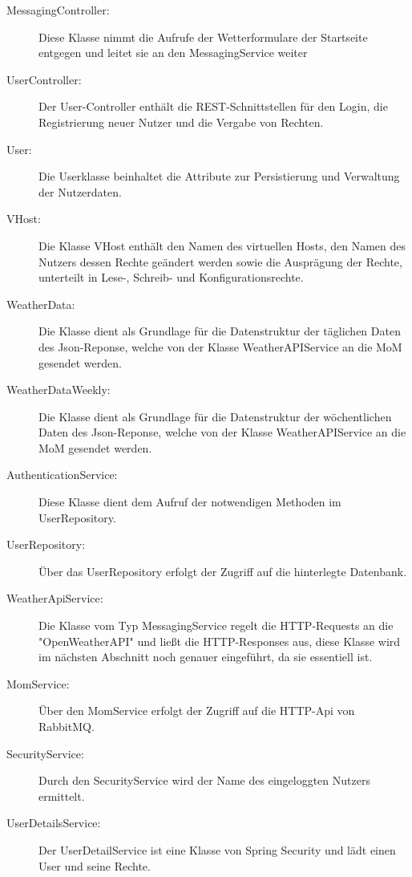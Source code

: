\begin{description}


\item[MessagingController:]Diese Klasse nimmt die Aufrufe der Wetterformulare der Startseite entgegen und leitet sie an den MessagingService weiter

\item[UserController:]Der User-Controller enthält die REST-Schnittstellen für den Login, die Registrierung neuer Nutzer und die Vergabe von Rechten. 
\item[User:]Die Userklasse beinhaltet die Attribute zur Persistierung und Verwaltung der Nutzerdaten.
\item[VHost:] Die Klasse VHost enthält den Namen des virtuellen Hosts, den Namen des Nutzers dessen Rechte geändert werden sowie die Ausprägung der Rechte, unterteilt in Lese-, Schreib- und Konfigurationsrechte.
\item[WeatherData:]Die Klasse dient als Grundlage für die Datenstruktur der täglichen Daten des Json-Reponse, welche von der Klasse WeatherAPIService an die MoM gesendet werden. 
\item[WeatherDataWeekly:]Die Klasse dient als Grundlage für die Datenstruktur der wöchentlichen Daten des Json-Reponse, welche von der Klasse WeatherAPIService an die MoM gesendet werden. 
\item[AuthenticationService:]Diese Klasse dient dem Aufruf der notwendigen Methoden im UserRepository.
\item[UserRepository:]Über das UserRepository erfolgt der Zugriff auf die hinterlegte Datenbank.
\item[WeatherApiService:]Die Klasse vom Typ MessagingService regelt die HTTP-Requests an die "OpenWeatherAPI" und ließt die HTTP-Responses aus, diese Klasse wird im nächsten Abschnitt noch genauer eingeführt, da sie essentiell ist. 

\item[MomService:]Über den MomService erfolgt der Zugriff auf die HTTP-Api von RabbitMQ.
\item[SecurityService:]Durch den SecurityService wird der Name des eingeloggten Nutzers ermittelt.

\item[UserDetailsService:]Der UserDetailService ist eine Klasse von Spring Security und lädt einen User und seine Rechte.


\end{description}
